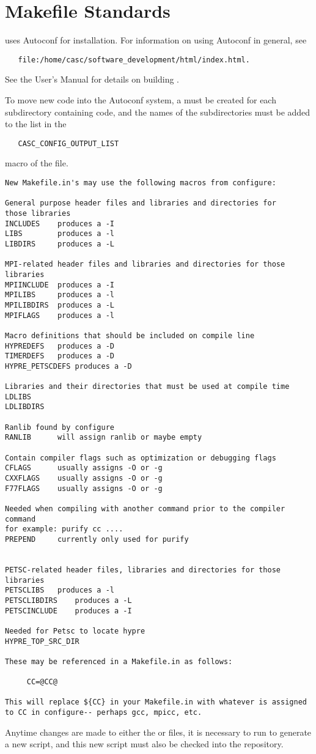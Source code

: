 \chapter{Makefile Standards}
\label{Makefile Standards}

\hypre{} uses Autoconf for installation.  For information on using
Autoconf in general, see
\begin{verbatim}
   file:/home/casc/software_development/html/index.html.
\end{verbatim}
See the User's Manual for details on building \hypre{}.

To move new code into the Autoconf system, a  must be
created for each subdirectory containing code, and the names of the
subdirectories must be added to the list in the
\begin{verbatim}
   CASC_CONFIG_OUTPUT_LIST
\end{verbatim}
macro of the  file.

\begin{verbatim}
New Makefile.in's may use the following macros from configure:

General purpose header files and libraries and directories for
those libraries 
INCLUDES  	produces a -I
LIBS		produces a -l
LIBDIRS		produces a -L

MPI-related header files and libraries and directories for those libraries
MPIINCLUDE	produces a -I
MPILIBS		produces a -l
MPILIBDIRS	produces a -L
MPIFLAGS	produces a -l

Macro definitions that should be included on compile line
HYPREDEFS	produces a -D
TIMERDEFS	produces a -D
HYPRE_PETSCDEFS produces a -D

Libraries and their directories that must be used at compile time 
LDLIBS
LDLIBDIRS

Ranlib found by configure
RANLIB		will assign ranlib or maybe empty

Contain compiler flags such as optimization or debugging flags
CFLAGS		usually assigns -O or -g
CXXFLAGS	usually assigns -O or -g
F77FLAGS	usually assigns -O or -g

Needed when compiling with another command prior to the compiler command
for example: purify cc ....
PREPEND 	currently only used for purify


PETSC-related header files, libraries and directories for those libraries
PETSCLIBS	produces a -l
PETSCLIBDIRS	produces a -L
PETSCINCLUDE 	produces a -I

Needed for Petsc to locate hypre
HYPRE_TOP_SRC_DIR 

These may be referenced in a Makefile.in as follows:
  
	 CC=@CC@

This will replace ${CC} in your Makefile.in with whatever is assigned
to CC in configure-- perhaps gcc, mpicc, etc.

\end{verbatim}

Anytime changes are made to either the  or
 files, it is necessary to run  to
generate a new  script, and this new script must also
be checked into the repository.

